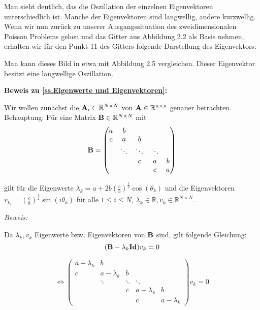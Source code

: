 Man sieht deutlich, das die Oszillation der einzelnen Eigenvektoren unterschiedlich ist. Manche der Eigenvektoren sind langwellig, andere kurzwellig. Wenn wir nun zurück zu unserer Ausgangssituation des zweidimensionalen Poisson Problems gehen und das Gitter aus Abbildung 2.2 als Basis nehmen, erhalten wir für den Punkt 11 des Gitters folgende Darstellung des Eigenvektors:

\label{img.Jacobi1}

Man kann dieses Bild in etwa mit Abbildung 2.5 vergleichen. Dieser Eigenvektor besitzt eine langwellige Oszillation.

\textbf{Beweis zu \autoref{ss.Eigenwerte und Eigenvektoren}:}

Wir wollen zunächst die ${\textbf{A}}_{i} \in \mathbb{R}^{N \times N}$ von ${\textbf{A}} \in \mathbb{R}^{n \times n}$ genauer betrachten.\\
Behauptung: Für eine Matrix ${\textbf{B}} \in \mathbb{R}^{N \times N}$ mit
\begin{equation}
{\textbf{B}} = 
\begin{pmatrix}
a & b\\
c & a & b\\
  & \ddots & \ddots & \ddots\\
  &		   & c & a & b\\
  &		   &  & c & a
\end{pmatrix}
\end{equation}

gilt für die Eigenwerte $\lambda_{k} = a + 2b\left(\frac{c}{b}\right)^{\frac{1}{2}} \cos(\theta_{k})$ und die Eigenvektoren $v_{k_{i}} = \left(\frac{c}{b}\right)^{\frac{i}{2}} \sin(i \theta_{k})$ für alle $1 \le i \le N$, $\lambda_{k} \in \mathbb{R}, v_{k} \in \mathbb{R}^{N \times N}$.

\textit{Beweis:}

Da $\lambda_{k}, v_{k}$ Eigenwerte bzw. Eigenvektoren von ${\textbf{B}}$ sind, gilt folgende Gleichung:
\begin{equation}
({\textbf{B}} - \lambda_{k} {\textbf{Id}}) v_{k} = 0
\end{equation}

\begin{equation}
\Longleftrightarrow
\begin{pmatrix}
a - \lambda_{k} & b\\
c & a - \lambda_{k} & b\\
  & \ddots & \ddots & \ddots\\
  &		   & c & a - \lambda_{k} & b\\
  &		   &  & c & a - \lambda_{k}
\end{pmatrix}
v_{k} = 0
\end{equation}


